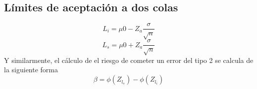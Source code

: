 \subsection{Límites de aceptación a dos colas}
\[
  L_i = \mu0 - Z_a \frac{\sigma}{\sqrt{n}}
  \]
  \[
    L_s = \mu0 + Z_a \frac{\sigma}{\sqrt{n}}
    \]
Y similarmente, el cálculo de el riesgo de cometer un error del tipo 2 se calcula de la
siguiente forma
\[
  \beta = \phi(Z_l_s)-\phi(Z_l_i)
\]






%
%
